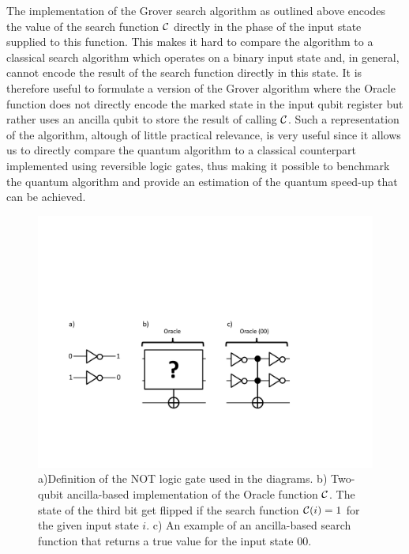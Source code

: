 The implementation of the Grover search algorithm as outlined above encodes the value of the search function $\Or$ directly in the phase of the input state supplied to this function. This makes it hard to compare the algorithm to a classical search algorithm which operates on a binary input state and, in general, cannot encode the result of the search function directly in this state. It is therefore useful to formulate a version of the Grover algorithm where the Oracle function does not directly encode the marked state in the input qubit register but rather uses an ancilla qubit to store the result of calling $\Or$. Such a representation of the algorithm, altough of little practical relevance, is very useful since it allows us to directly compare the quantum algorithm to a classical counterpart implemented using reversible logic gates, thus making it possible to benchmark the quantum algorithm and provide an estimation of the quantum speed-up that can be achieved.

\begin{figure}[ht!]
	\centering
		\includegraphics[width=\textwidth]{./material/papers/grover/different_oracle_implementations}
	\caption[]{a)Definition of the NOT logic gate used in the diagrams. b) Two-qubit ancilla-based implementation of the Oracle function $\Or$. The state of the third bit get flipped if the search function $\Or(i)=1$ for the given input state $i$. c) An example of an ancilla-based search function that returns a true value for the input state $00$.}
	\label{fig:GroverOracleImplementations}
\end{figure}

